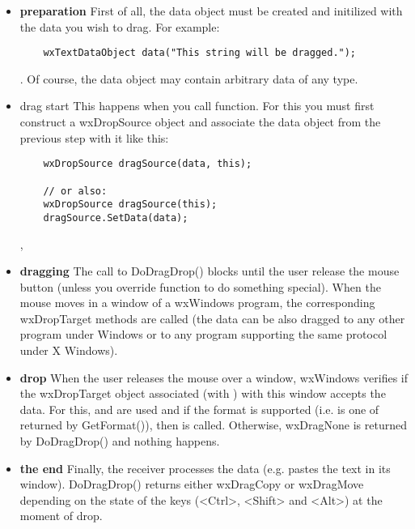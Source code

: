 \begin{itemize}\itemsep=0pt
\item {\bf preparation} First of all, the data object must be created and
initilized with the data you wish to drag. For example:

\begin{verbatim}
	wxTextDataObject data("This string will be dragged.");
\end{verbatim}. Of course, the data object may contain arbitrary data of any
type.

\item{drag start} This happens when you call  function. For this you must first
construct a wxDropSource object and associate the data object from the
previous step with it like this:

\begin{verbatim}
	wxDropSource dragSource(data, this);

	// or also:
	wxDropSource dragSource(this);
	dragSource.SetData(data);
\end{verbatim},

\item {\bf dragging} The call to DoDragDrop() blocks until the user release the
mouse button (unless you override  function to do something
special). When the mouse moves in a window of a wxWindows program, the
corresponding wxDropTarget methods are called (the data can be also dragged to
any other program under Windows or to any program supporting the same protocol
under X Windows).
\item {\bf drop} When the user releases the mouse over a window, wxWindows verifies
if the wxDropTarget object associated (with ) with this window accepts the data. For
this,  and  are used and if the format is
supported (i.e. is one of returned by GetFormat()), then  is called. Otherwise, wxDragNone is
returned by DoDragDrop() and nothing happens.
\item {\bf the end} Finally, the receiver processes the data (e.g. pastes the text
in its window). DoDragDrop() returns either wxDragCopy or wxDragMove
depending on the state of the keys (<Ctrl>, <Shift> and <Alt>) at the moment
of drop.
\end{itemize}

